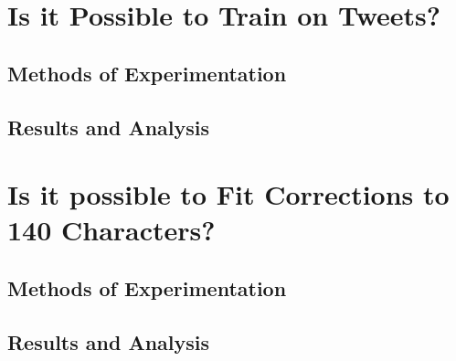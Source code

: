 \section{Is it Possible to Train on Tweets?}
\subsection{Methods of Experimentation}
\subsection{Results and Analysis}

\section{Is it possible to Fit Corrections to 140 Characters?}
\subsection{Methods of Experimentation}
\subsection{Results and Analysis}

